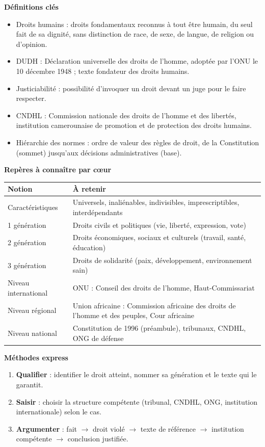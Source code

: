 \documentclass[11pt]{article}
\newcommand{\cle}[1]{{\popxbold\color{popdark}#1}}
\begin{document}
\begin{bilan}
\textbf{Définitions clés}
\begin{itemize}
  \item \cle{Droits humains} : droits fondamentaux reconnus à tout être humain, du seul fait de sa \cle{dignité}, sans distinction de race, de sexe, de langue, de religion ou d'opinion.
  \item \cle{DUDH} : Déclaration universelle des droits de l'homme, adoptée par l'ONU le 10 décembre 1948 ; texte fondateur des droits humains.
  \item \cle{Justiciabilité} : possibilité d'invoquer un droit devant un juge pour le faire respecter.
  \item \cle{CNDHL} : Commission nationale des droits de l'homme et des libertés, institution camerounaise de promotion et de protection des droits humains.
  \item \cle{Hiérarchie des normes} : ordre de valeur des règles de droit, de la Constitution (sommet) jusqu'aux décisions administratives (base).
\end{itemize}

\textbf{Repères à connaître par c\oe ur}
\begin{center}
\begin{tabularx}{\linewidth}{|l|X|}
\hline
\rowcolor{popblueL} \textbf{Notion} & \textbf{À retenir} \\
\hline
Caractéristiques & Universels, inaliénables, indivisibles, imprescriptibles, interdépendants \\
\hline
1\iere{} génération & Droits civils et politiques (vie, liberté, expression, vote) \\
\hline
2\ieme{} génération & Droits économiques, sociaux et culturels (travail, santé, éducation) \\
\hline
3\ieme{} génération & Droits de solidarité (paix, développement, environnement sain) \\
\hline
Niveau international & ONU : Conseil des droits de l'homme, Haut-Commissariat \\
\hline
Niveau régional & Union africaine : Commission africaine des droits de l'homme et des peuples, Cour africaine \\
\hline
Niveau national & Constitution de 1996 (préambule), tribunaux, CNDHL, ONG de défense \\
\hline
\end{tabularx}
\end{center}

\textbf{Méthodes express}
\begin{enumerate}
  \item \textbf{Qualifier} : identifier le droit atteint, nommer sa génération et le texte qui le garantit.
  \item \textbf{Saisir} : choisir la structure compétente (tribunal, CNDHL, ONG, institution internationale) selon le cas.
  \item \textbf{Argumenter} : fait $\rightarrow$ droit violé $\rightarrow$ texte de référence $\rightarrow$ institution compétente $\rightarrow$ conclusion justifiée.
\end{enumerate}
\end{bilan}
\end{document}

